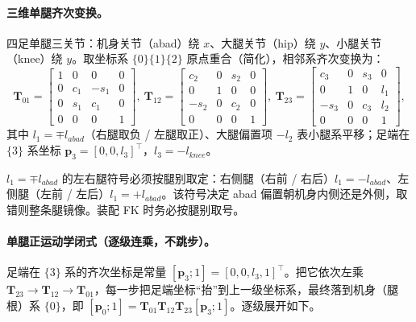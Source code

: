 \paragraph{三维单腿齐次变换。}
四足单腿三关节：机身关节（abad）绕 $x$、大腿关节（hip）绕 $y$、小腿关节（knee）绕 $y$。取坐标系 $\{0\}\{1\}\{2\}$ 原点重合（简化），相邻系齐次变换为\cite{unitree2023quadruped}：
\begin{equation}
  \mathbf{T}_{01}=\begin{bmatrix}1&0&0&0\\0&c_1&-s_1&0\\0&s_1&c_1&0\\0&0&0&1\end{bmatrix},\
  \mathbf{T}_{12}=\begin{bmatrix}c_2&0&s_2&0\\0&1&0&0\\-s_2&0&c_2&0\\0&0&0&1\end{bmatrix},\
  \mathbf{T}_{23}=\begin{bmatrix}c_3&0&s_3&0\\0&1&0&l_1\\-s_3&0&c_3&l_2\\0&0&0&1\end{bmatrix},
  \label{eq:qk-3d-T}
\end{equation}
其中 $l_1=\mp l_{abad}$（右腿取负 / 左腿取正）、大腿偏置项 $-l_2$ 表小腿系平移；足端在 $\{3\}$ 系坐标 $\boldsymbol{p}_3=[0,0,l_3]^\top$，$l_3=-l_{knee}$\cite{unitree2023quadruped}。

\begin{note}[左右腿 abad 偏置符号约定]\label{note:qk-ocr-leg-sign}
$l_1=\mp l_{abad}$ 的左右腿符号必须按腿别取定：右侧腿（右前 / 右后）$l_1=-l_{abad}$、左侧腿（左前 / 左后）$l_1=+l_{abad}$\cite{unitree2023quadruped}。该符号决定 abad 偏置朝机身内侧还是外侧，取错则整条腿镜像。装配 FK 时务必按腿别取号。
\end{note}

\paragraph{单腿正运动学闭式（逐级连乘，不跳步）。}
足端在 $\{3\}$ 系的齐次坐标是常量 $[\boldsymbol{p}_3;1]=[0,0,l_3,1]^\top$。把它依次左乘 $\mathbf{T}_{23}\to\mathbf{T}_{12}\to\mathbf{T}_{01}$，每一步把足端坐标“抬”到上一级坐标系，最终落到机身（腿根）系 $\{0\}$，即 $[\boldsymbol{p}_0;1]=\mathbf{T}_{01}\mathbf{T}_{12}\mathbf{T}_{23}[\boldsymbol{p}_3;1]$\cite{unitree2023quadruped}。逐级展开如下。

